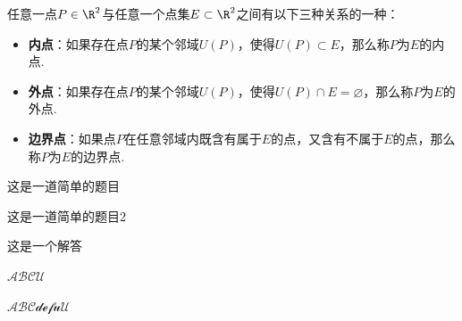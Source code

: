 \documentclass[12pt, a4paper, oneside, UTF8]{ctexbook}
\begin{document}
	
	任意一点$P \in \R^2$与任意一个点集$E \subset \R^2$之间有以下三种关系的一种：
	\begin{itemize}[leftmargin=45pt]
		\item \textbf{内点}：如果存在点$P$的某个邻域$U(P)$，使得$U(P) \subset E$，那么称$P$为$E$的内点.
		\item \textbf{外点}：如果存在点$P$的某个邻域$U(P)$，使得$U(P) \cap E = \varnothing$，那么称$P$为$E$的外点.
		\item \textbf{边界点}：如果点$P$在任意邻域内既含有属于$E$的点，又含有不属于$E$的点，那么称$P$为$E$的边界点.
	\end{itemize}
	
	\begin{problem}
		这是一道简单的题目
	\end{problem}
	
	\begin{problem}
		这是一道简单的题目2
	\end{problem}
	\begin{answer}
		这是一个解答
	\end{answer}
	
	
	
$\mathcal{A B C U}$ 

$\mathscr{ABCdef u U}$
	\ifx\allfiles\undefined
\end{document}

